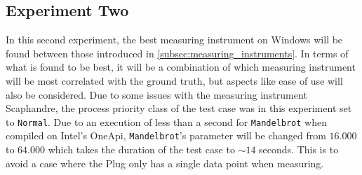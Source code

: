 \subsection{Experiment Two}\label{subsec:exp_two}

In this second experiment, the best measuring instrument on Windows will be found between those introduced in \cref{subsec:measuring_instruments}. In terms of what is found to be best, it will be a combination of which measuring instrument will be most correlated with the ground truth, but aspects like ease of use will also be considered. Due to some issues with the measuring instrument Scaphandre, the process priority class of the test case was in this experiment set to \texttt{Normal}. Due to an execution of less than a second for \texttt{Mandelbrot} when compiled on Intel's OneApi, \texttt{Mandelbrot}'s parameter will be changed from $16.000$ to $64.000$ which takes the duration of the test case to $\sim 14$ seconds. This is to avoid a case where the Plug only has a single data point when measuring.